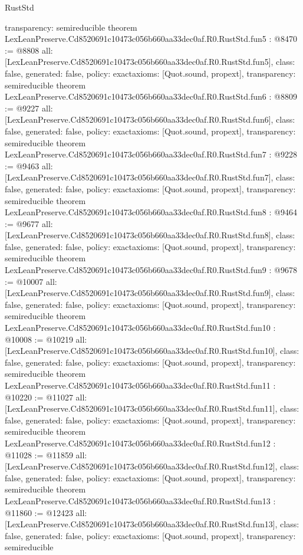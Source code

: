 \begin{lexlean}{RustStd}
\begin{coremodule}
{  transparency: semireducible
}
theorem LexLeanPreserve.Cd8520691c10473c056b660aa33dec0af.R0.RustStd.fun5 : @8470 := @8808 {
  all: [LexLeanPreserve.Cd8520691c10473c056b660aa33dec0af.R0.RustStd.fun5],
  class: false,
  generated: false,
  policy: exact{axioms: [Quot.sound, propext]},
  transparency: semireducible
}
theorem LexLeanPreserve.Cd8520691c10473c056b660aa33dec0af.R0.RustStd.fun6 : @8809 := @9227 {
  all: [LexLeanPreserve.Cd8520691c10473c056b660aa33dec0af.R0.RustStd.fun6],
  class: false,
  generated: false,
  policy: exact{axioms: [Quot.sound, propext]},
  transparency: semireducible
}
theorem LexLeanPreserve.Cd8520691c10473c056b660aa33dec0af.R0.RustStd.fun7 : @9228 := @9463 {
  all: [LexLeanPreserve.Cd8520691c10473c056b660aa33dec0af.R0.RustStd.fun7],
  class: false,
  generated: false,
  policy: exact{axioms: [Quot.sound, propext]},
  transparency: semireducible
}
theorem LexLeanPreserve.Cd8520691c10473c056b660aa33dec0af.R0.RustStd.fun8 : @9464 := @9677 {
  all: [LexLeanPreserve.Cd8520691c10473c056b660aa33dec0af.R0.RustStd.fun8],
  class: false,
  generated: false,
  policy: exact{axioms: [Quot.sound, propext]},
  transparency: semireducible
}
theorem LexLeanPreserve.Cd8520691c10473c056b660aa33dec0af.R0.RustStd.fun9 : @9678 := @10007 {
  all: [LexLeanPreserve.Cd8520691c10473c056b660aa33dec0af.R0.RustStd.fun9],
  class: false,
  generated: false,
  policy: exact{axioms: [Quot.sound, propext]},
  transparency: semireducible
}
theorem LexLeanPreserve.Cd8520691c10473c056b660aa33dec0af.R0.RustStd.fun10 : @10008 := @10219 {
  all: [LexLeanPreserve.Cd8520691c10473c056b660aa33dec0af.R0.RustStd.fun10],
  class: false,
  generated: false,
  policy: exact{axioms: [Quot.sound, propext]},
  transparency: semireducible
}
theorem LexLeanPreserve.Cd8520691c10473c056b660aa33dec0af.R0.RustStd.fun11 : @10220 := @11027 {
  all: [LexLeanPreserve.Cd8520691c10473c056b660aa33dec0af.R0.RustStd.fun11],
  class: false,
  generated: false,
  policy: exact{axioms: [Quot.sound, propext]},
  transparency: semireducible
}
theorem LexLeanPreserve.Cd8520691c10473c056b660aa33dec0af.R0.RustStd.fun12 : @11028 := @11859 {
  all: [LexLeanPreserve.Cd8520691c10473c056b660aa33dec0af.R0.RustStd.fun12],
  class: false,
  generated: false,
  policy: exact{axioms: [Quot.sound, propext]},
  transparency: semireducible
}
theorem LexLeanPreserve.Cd8520691c10473c056b660aa33dec0af.R0.RustStd.fun13 : @11860 := @12423 {
  all: [LexLeanPreserve.Cd8520691c10473c056b660aa33dec0af.R0.RustStd.fun13],
  class: false,
  generated: false,
  policy: exact{axioms: [Quot.sound, propext]},
  transparency: semireducible
}
\end{coremodule}
\end{lexlean}
